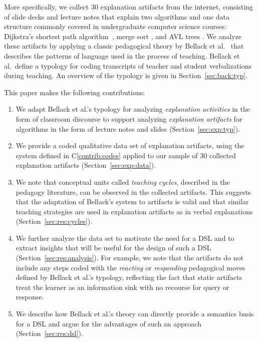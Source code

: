 \documentclass[sigconf]{acmart}
\begin{document}
More specifically, we collect 30 explanation artifacts from the internet,
consisting of slide decks and lecture notes that explain two algorithms and one
data structure commonly covered in undergraduate computer science courses:
Dijkstra's shortest path algorithm~\cite[pp.~137--142]{KT06}, merge sort
\cite[210--214]{KT06}, and AVL trees \cite[pp.~458--475]{KnuthArt3}.
%
We analyze these artifacts by applying a classic pedagogical theory by Bellack
et al.~\cite{bellack1966language} that describes the patterns of language used
in the process of teaching. Bellack et al.\ define a typology for coding
transcripts of teacher and student verbalizations during teaching. An overview
of the typology is given in Section~\ref{sec:back:typ}.


This paper makes the following contributions:
%
\begin{enumerate}[C1.]

\item \label{contrib:codes}
%
We adapt Bellack et al.'s typology for analyzing \emph{explanation activities}
in the form of classroom discourse to support analyzing \emph{explanation
artifacts} for algorithms in the form of lecture notes and slides
(Section~\ref{sec:exp:typ}).

\item \label{contrib:data}
%
We provide a coded qualitative data set of explanation artifacts, using the
system defined in C\ref{contrib:codes} applied to our sample of 30 collected
explanation artifacts (Section~\ref{sec:exp:data}).

\item \label{contrib:valid}
%
We note that conceptual units called \emph{teaching cycles}, described in the
pedagogy literature, can be observed in the collected artifacts. This suggests
that the adaptation of Bellack's system to artifacts is valid and that similar
teaching strategies are used in explanation artifacts as in verbal explanations
(Section~\ref{sec:res:cycles}).

\item \label{contrib:analysis}
%
We further analyze the data set to motivate the need for a DSL and to extract
insights that will be useful for the design of such a DSL
(Section~\ref{sec:res:analysis}). For example, we note that the artifacts do
not include any steps coded with the \emph{reacting} or \emph{responding}
pedagogical moves defined by Bellack et al.'s typology, reflecting the fact
that static artifacts treat the learner as an information sink with no recourse
for query or response.

\item \label{contrib:dsl}
%
We describe how Bellack et al.'s theory can directly provide a semantics basis
for a DSL and argue for the advantages of such an approach (Section~\ref{sec:res:dsl}).
%
\end{enumerate}
\end{document}
